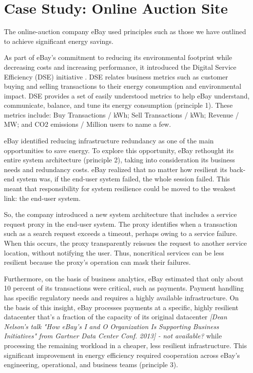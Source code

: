 \section{Case Study: Online Auction Site}

The online-auction company eBay used principles such as those we have outlined to achieve significant energy savings.

As part of eBay's commitment to reducing its environmental footprint while decreasing costs and increasing performance, it introduced the Digital Service Efficiency (DSE) initiative \cite{ebay2013-digitalefficiency}. DSE relates business metrics such as customer buying and selling transactions to their energy consumption and environmental impact. DSE provides a set of easily understood metrics to help eBay understand, communicate, balance, and tune its energy consumption (principle 1). These metrics include: Buy Transactions / kWh; Sell Transactions / kWh; Revenue / MW; and CO2 emissions / Million users to name a few.

eBay identified reducing infrastructure redundancy as one of the main opportunities to save energy. To explore this opportunity, eBay rethought its entire system architecture (principle 2), taking into consideration its business needs and redundancy costs. eBay realized that no matter how resilient its back-end system was, if the end-user system failed, the whole session failed. This meant that responsibility for system resilience could be moved to the weakest link: the end-user system.

So, the company introduced a new system architecture that includes a service request proxy in the end-user system. The proxy identifies when a transaction such as a search request exceeds a timeout, perhaps owing to a service failure. When this occurs, the proxy transparently reissues the request to another service location, without notifying the user. Thus, noncritical services can be less resilient because the proxy's operation can mask their failures.

Furthermore, on the basis of business analytics, eBay estimated that only about 10 percent of its transactions were critical, such as payments. Payment handling has specific regulatory needs and requires a highly available infrastructure. On the basis of this insight, eBay processes payments at a specific, highly resilient datacenter that's a fraction of the capacity of its original datacenter \emph{[Dean Nelson's talk "How eBay's I and O Organization Is Supporting Business Initiatives" from Gartner Data Center Conf. 2013] - not available?} while processing the remaining workload in a cheaper, less resilient infrastructure. This significant improvement in energy efficiency required cooperation across eBay's engineering, operational, and business teams (principle 3).

